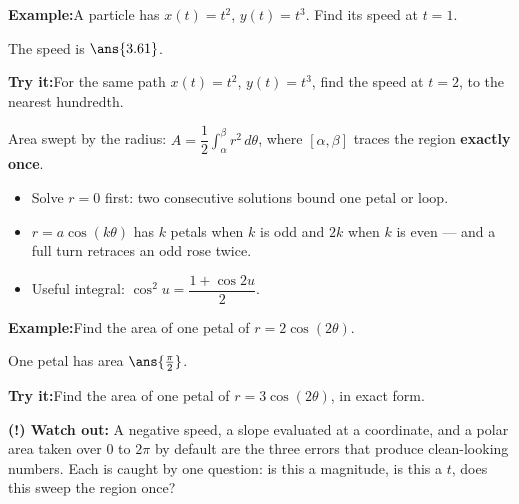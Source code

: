 \documentclass[12pt]{article}
\begin{document}
\begin{examplebox}
\textbf{Example:}\quad A particle has $x(t) = t^2$, $y(t) = t^3$. Find its speed
at $t = 1$.

The speed is $\ans{3.61}$.
\end{examplebox}

\begin{tryitbox}
\textbf{Try it:}\quad For the same path $x(t) = t^2$, $y(t) = t^3$, find the
speed at $t = 2$, to the nearest hundredth.\\[2pt]
\end{tryitbox}


\begin{formulabox}
Area swept by the radius: $A = \dfrac{1}{2}\displaystyle\int_{\alpha}^{\beta} r^2\,
d\theta$, where $[\alpha, \beta]$ traces the region \textbf{exactly once}.
\begin{itemize}[leftmargin=0.8cm, itemsep=1pt, topsep=2pt]
  \item Solve $r = 0$ first: two consecutive solutions bound one petal or loop.
  \item $r = a\cos(k\theta)$ has $k$ petals when $k$ is odd and $2k$ when $k$ is
        even --- and a full turn retraces an odd rose twice.
  \item Useful integral: $\cos^2 u = \dfrac{1 + \cos 2u}{2}$.
\end{itemize}
\end{formulabox}

\begin{examplebox}
\textbf{Example:}\quad Find the area of one petal of $r = 2\cos(2\theta)$.

One petal has area $\ans{\tfrac{\pi}{2}}$.
\end{examplebox}

\begin{tryitbox}
\textbf{Try it:}\quad Find the area of one petal of $r = 3\cos(2\theta)$, in
exact form.\\[2pt]
\end{tryitbox}

\begin{watchoutbox}
\textbf{(!) Watch out:} A negative speed, a slope evaluated at a coordinate, and
a polar area taken over $0$ to $2\pi$ by default are the three errors that
produce clean-looking numbers. Each is caught by one question: is this a
magnitude, is this a $t$, does this sweep the region once?
\end{watchoutbox}
\end{document}

